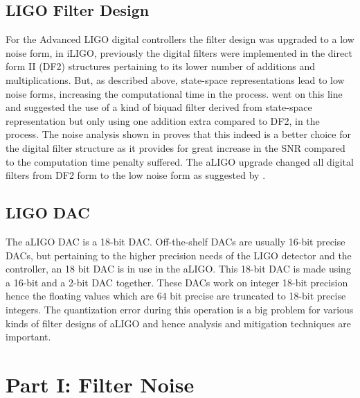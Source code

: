 \documentclass[a4paper,12pt]{article}
\begin{document}
    		\subsection{LIGO Filter Design}
    		
For the Advanced LIGO digital controllers the filter design was upgraded to a low noise form, in iLIGO, previously the digital filters were implemented in  the direct form II (DF2) structures pertaining to its lower number of additions and multiplications.
But, as described above, state-space representations lead to low noise forms, increasing the computational time in the process. \cite{Matts} went on this line and suggested the use of a kind of biquad filter derived from state-space representation but only using one addition extra compared to DF2, in the process. The noise analysis shown in \cite{Matts} proves that this indeed is a better choice for the digital filter structure as it provides for great increase in the SNR compared to the computation time penalty suffered. The aLIGO upgrade changed all digital filters from DF2 form to the low noise form as suggested by \cite{Matts}.

	\subsection{LIGO DAC}
	The aLIGO DAC is a 18-bit DAC. Off-the-shelf DACs are usually 16-bit precise DACs, but pertaining to the higher precision needs of the LIGO detector and the controller, an 18 bit DAC is in use in the aLIGO. This 18-bit DAC is made using a 16-bit and a 2-bit DAC together. These DACs work on integer 18-bit precision hence the floating values which are 64 bit precise are truncated to 18-bit precise integers. The quantization error during this operation is a big problem for various kinds of filter designs of aLIGO and hence analysis and mitigation techniques are important. 

\section{Part I: Filter Noise}
\label{filter}
\end{document}
